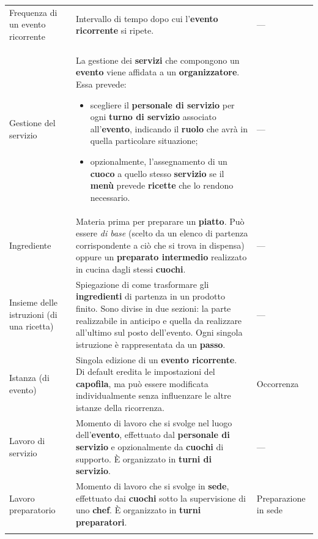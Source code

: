 \begin{longtable}{L{3.5cm} L{8.5cm} L{3cm}}
Frequenza di un evento ricorrente
& Intervallo di tempo dopo cui l'\textbf{evento ricorrente} si ripete.
& — \\
\addlinespace

Gestione del servizio
& La gestione dei \textbf{servizi} che compongono un \textbf{evento} viene
  affidata a un \textbf{organizzatore}. Essa prevede:
  \begin{itemize}[nosep,leftmargin=*]
    \item scegliere il \textbf{personale di servizio} per ogni
          \textbf{turno di servizio} associato all'\textbf{evento},
          indicando il \textbf{ruolo} che avrà in quella particolare
          situazione;
    \item opzionalmente, l'assegnamento di un \textbf{cuoco} a quello stesso
          \textbf{servizio} se il \textbf{menù} prevede \textbf{ricette}
          che lo rendono necessario.
  \end{itemize}
& — \\
\addlinespace

Ingrediente
& Materia prima per preparare un \textbf{piatto}. Può essere \emph{di base}
  (scelto da un elenco di partenza corrispondente a ciò che si trova in
  dispensa) oppure un \textbf{preparato intermedio} realizzato in cucina
  dagli stessi \textbf{cuochi}.
& — \\
\addlinespace

Insieme delle istruzioni (di una ricetta)
& Spiegazione di come trasformare gli \textbf{ingredienti} di partenza in un
  prodotto finito. Sono divise in due sezioni: la parte realizzabile in
  anticipo e quella da realizzare all'ultimo sul posto dell'evento. Ogni
  singola istruzione è rappresentata da un \textbf{passo}.
& — \\
\addlinespace

Istanza (di evento)
& Singola edizione di un \textbf{evento ricorrente}. Di default
  eredita le impostazioni del \textbf{capofila}, ma può essere
  modificata individualmente senza influenzare le altre istanze
  della ricorrenza.
& Occorrenza \\
\addlinespace

Lavoro di servizio
& Momento di lavoro che si svolge nel luogo dell'\textbf{evento}, effettuato
  dal \textbf{personale di servizio} e opzionalmente da \textbf{cuochi} di
  supporto. È organizzato in \textbf{turni di servizio}.
& — \\
\addlinespace

Lavoro preparatorio
& Momento di lavoro che si svolge in \textbf{sede}, effettuato dai
  \textbf{cuochi} sotto la supervisione di uno \textbf{chef}. È organizzato
  in \textbf{turni preparatori}.
& Preparazione in sede \\
\addlinespace


\end{longtable}
